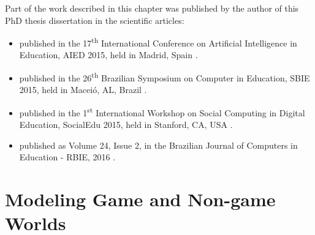 Part of the work described in this chapter was published by the author of this PhD thesis dissertation in the scientific articles:

\begin{itemize}
\item
{} published in the 17\textsuperscript{th} International Conference on Artificial Intelligence in Education, AIED 2015, held in Madrid, Spain \cite{ChallcoMizoguchiBittencourtIsotani2015a}.

\item
{} published in the 26\textsuperscript{th} Brazilian Symposium on Computer in Education, SBIE 2015, held in Maceió, AL, Brazil \cite{ChallcoAndradeOliveiraMizoguchiIsotani2015}.

\item
{} published in the 1\textsuperscript{st} International Workshop on Social Computing in Digital Education, SocialEdu 2015, held in Stanford, CA, USA \cite{ChallcoMizoguchiBittencourtIsotani2015}.

\item
{} published as Volume 24, Issue 2, in the Brazilian Journal of Computers in Education - RBIE, 2016 \cite{ChallcoMizoguchiIsotani2016}.
\end{itemize}

\section{Modeling Game and Non-game Worlds}
\label{sec:modeling-game-non-game-worlds}

